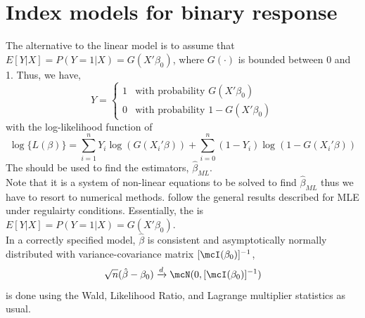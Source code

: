 \section{Index models for binary response}
The alternative to the linear model is to assume that $E[Y|X] = P(Y=1|X) = G(X'\beta_0)$,
where $G(\cdot)$ is bounded between 0 and 1. Thus, we have,
\begin{equation}
    Y = \begin{cases}
        1 & \text{with probability }G(X'\beta_0)\\
        0 & \text{with probability }1-G(X'\beta_0)
    \end{cases}
\end{equation}
with the log-likelihood function of
\begin{equation}
    \log\{L(\beta)\} = \sum_{i=1}^{n} Y_i\log(G(X_i'\beta)) + \sum_{i=0}^{n}(1-Y_i)\log(1-G(X_i'\beta))
\end{equation}
The  should be used to find the estimators, $\hat{\beta}_{ML}$.\\

Note that it is a system of non-linear equations to be solved to find $\hat{\beta}_{ML}$
thus we have to resort to numerical methods. 
 follow the general results described for MLE under regulairty conditions.
Essentially, the  is $E[Y|X] = P(Y=1|X) = G(X'\beta_0)$.\\

In a correctly specified model, $\hat{\beta}$ is consistent and asymptotically normally distributed
with variance-covariance matrix $[\mcI(\beta_0)]^{-1}$,
\begin{equation*}
    \sqrt{n}(\hat{\beta}-\beta_0)\xrightarrow{d}\mcN(0,[\mcI(\beta_0)]^{-1})
\end{equation*}
 is done using the Wald, Likelihood Ratio, and Lagrange multiplier statistics as usual.

